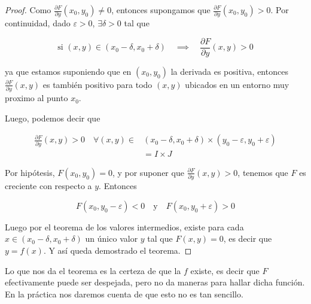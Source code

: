 \begin{proof}
    Como $\frac{\partial F}{\partial y} (x_0, y_0) \neq 0$, entonces supongamos que $\frac{\partial F}{\partial y} (x_0, y_0) > 0$. Por continuidad, dado $\varepsilon > 0$, $\exists \delta > 0$ tal que
    
    \[
    \text{si $\displaystyle (x,y) \in (x_0 - \delta, x_0 + \delta)$} \quad \implies \quad \dfrac{\partial F}{\partial y}(x,y) > 0
    \]
    
    \noindent ya que estamos suponiendo que en $(x_0, y_0)$ la derivada es positiva, entonces $\frac{\partial F}{\partial y} (x, y)$ es también positivo para todo $(x,y)$ ubicados en un entorno muy proximo al punto $x_0$.
    
    Luego, podemos decir que
    
    \begin{align*}
        \frac{\partial F}{\partial y} (x, y) > 0 \quad \forall (x,y) \in &(x_0 - \delta, x_0 + \delta) \times (y_0 - \varepsilon, y_0 + \varepsilon) \\
            &= I \times J
    \end{align*}
    
    Por hipótesis, $F(x_0, y_0) = 0$, y por suponer que $\frac{\partial F}{\partial y} (x, y) > 0$, tenemos que $F$ es creciente con respecto a $y$. Entonces
    
    \[
    F(x_0, y_0 - \varepsilon) < 0 \quad \text{y} \quad F(x_0, y_0 + \varepsilon) > 0
    \]
    
    Luego por el teorema de los valores intermedios, existe para cada $x \in (x_0 - \delta, x_0 + \delta)$ un único valor $y$ tal que $F(x,y) = 0$, es decir que $y = f(x)$. Y así queda demostrado el teorema.
\end{proof}

\begin{aco}
    Lo que nos da el teorema es la certeza de que la $f$ existe, es decir que $F$ efectivamente puede ser despejada, pero no da maneras para hallar dicha función. En la práctica nos daremos cuenta de que esto no es tan sencillo.
\end{aco}